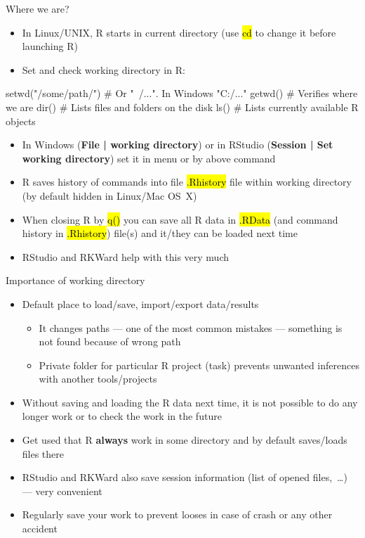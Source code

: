\documentclass[compress, ucs, xelatex, 11pt, xcolor=svgnames,
  hyperref={
    bookmarks=true,
    unicode=true,
    colorlinks=true,
    pdftitle={Molecular data in R},
    plainpages=false,
    pdfauthor={Vojtech Zeisek},
    pdfsubject={Course about phylogeny and evolution in R},
    pdfcreator={XeLaTeX},
    pdfkeywords={R, evolution, phylogeny, molecular data},
    linkcolor=Tomato,
    anchorcolor=SaddleBrown,
    citecolor=Goldenrod,
    filecolor=DarkMagenta,
    menucolor=Sienna,
    urlcolor=DarkTurquoise,
    pdftex},
  url={hyphens, lowtilde} %
  ]{beamer}
\renewcommand{\texttt}[1]{\hl{\ttfamily #1}}
\begin{document}
\begin{frame}[fragile]{Where we are?}
  \begin{itemize}
    \item In Linux/UNIX, R starts in current directory (use \texttt{cd} to change it before launching R)
    \item \alert{Set and check working directory} in R:
  \end{itemize}
  \begin{spluscode}
    setwd("/some/path/") # Or "~/...". In Windows "C:/..."
    getwd() # Verifies where we are
    dir() # Lists files and folders on the disk
    ls() # Lists currently available R objects
  \end{spluscode}
  \begin{itemize}
    \item In Windows (\textbf{File | working directory}) or in RStudio (\textbf{Session | Set working directory}) set it in menu or by above command
    \item R saves history of commands into file \texttt{.Rhistory} file within working directory (by default hidden in Linux/Mac OS~X)
    \item When closing R by \texttt{q()} you can save all R data in \texttt{.RData} (and command history in \texttt{.Rhistory}) file(s) and it/they can be loaded next time
    \item RStudio and RKWard help with this very much
  \end{itemize}
\end{frame}

\begin{frame}{Importance of working directory}
  \begin{itemize}
    \item Default place to load/save, import/export data/results
    \begin{itemize}
      \item It changes paths --- one of the most common mistakes --- something is not found because of wrong path
      \item Private folder for particular R project (task) prevents unwanted inferences with another tools/projects
    \end{itemize}
    \item Without saving and loading the R data next time, it is not possible to do any longer work or to check the work in the future
    \item \alert{Get used that R \textbf{always} work in some directory and by default saves/loads files there}
    \item RStudio and RKWard also save session information (list of opened files,~\ldots) --- very convenient
    \item Regularly save your work to prevent looses in case of crash or any other accident
  \end{itemize}
\end{frame}
\end{document}

